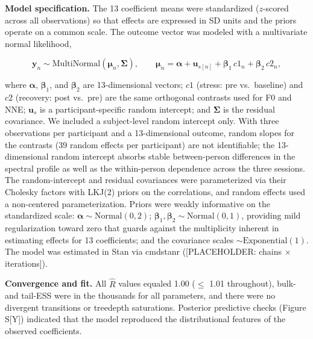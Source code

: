 \documentclass[
  english,
  man,floatsintext]{apa6}
\begin{document}
\textbf{Model specification.} The 13 coefficient means were standardized (\(z\)-scored across all observations) so that effects are expressed in SD units and the priors operate on a common scale. The outcome vector was modeled with a multivariate normal likelihood,

\[\mathbf{y}_n \sim \text{MultiNormal}(\boldsymbol{\mu}_n, \boldsymbol{\Sigma}), \qquad \boldsymbol{\mu}_n = \boldsymbol{\alpha} + \mathbf{u}_{s[n]} + \boldsymbol{\beta}_1\, c1_n + \boldsymbol{\beta}_2\, c2_n,\]

where \(\boldsymbol{\alpha}\), \(\boldsymbol{\beta}_1\), and \(\boldsymbol{\beta}_2\) are 13-dimensional vectors; \(c1\) (stress: pre vs.~baseline) and \(c2\) (recovery: post vs.~pre) are the same orthogonal contrasts used for F0 and NNE; \(\mathbf{u}_s\) is a participant-specific random intercept; and \(\boldsymbol{\Sigma}\) is the residual covariance. We included a subject-level random intercept only. With three observations per participant and a 13-dimensional outcome, random slopes for the contrasts (39 random effects per participant) are not identifiable; the 13-dimensional random intercept absorbs stable between-person differences in the spectral profile as well as the within-person dependence across the three sessions. The random-intercept and residual covariances were parameterized via their Cholesky factors with LKJ(2) priors on the correlations, and random effects used a non-centered parameterization. Priors were weakly informative on the standardized scale: \(\boldsymbol{\alpha} \sim \text{Normal}(0, 2)\); \(\boldsymbol{\beta}_1, \boldsymbol{\beta}_2 \sim \text{Normal}(0, 1)\), providing mild regularization toward zero that guards against the multiplicity inherent in estimating effects for 13 coefficients; and the covariance scales \(\sim \text{Exponential}(1)\). The model was estimated in Stan via cmdstanr ({[}PLACEHOLDER: chains \(\times\) iterations{]}).

\textbf{Convergence and fit.} All \(\hat{R}\) values equaled 1.00 (\(\leq\) 1.01 throughout), bulk- and tail-ESS were in the thousands for all parameters, and there were no divergent transitions or treedepth saturations. Posterior predictive checks (Figure S{[}Y{]}) indicated that the model reproduced the distributional features of the observed coefficients.
\end{document}
